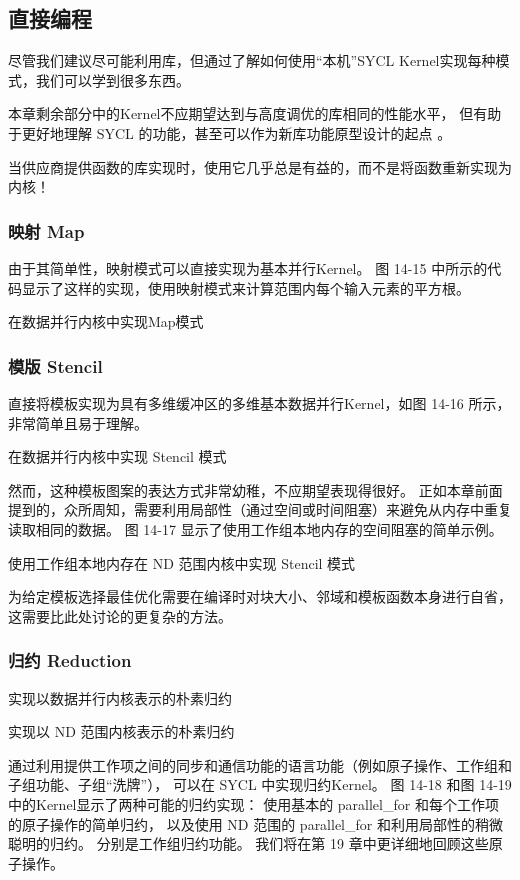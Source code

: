 \subsection{直接编程}
尽管我们建议尽可能利用库，但通过了解如何使用“本机”SYCL Kernel实现每种模式，我们可以学到很多东西。

本章剩余部分中的Kernel不应期望达到与高度调优的库相同的性能水平，
但有助于更好地理解 SYCL 的功能，甚至可以作为新库功能原型设计的起点 。

\begin{remark}[使用供应商提供的库！]
当供应商提供函数的库实现时，使用它几乎总是有益的，而不是将函数重新实现为内核！
\end{remark}

\subsubsection{映射 Map}
由于其简单性，映射模式可以直接实现为基本并行Kernel。 
图 14-15 中所示的代码显示了这样的实现，使用映射模式来计算范围内每个输入元素的平方根。

{\color{red} 在数据并行内核中实现Map模式}

\subsubsection{模版 Stencil}
直接将模板实现为具有多维缓冲区的多维基本数据并行Kernel，如图 14-16 所示，非常简单且易于理解。

{\color{red} 在数据并行内核中实现 Stencil 模式}

然而，这种模板图案的表达方式非常幼稚，不应期望表现得很好。 
正如本章前面提到的，众所周知，需要利用局部性（通过空间或时间阻塞）来避免从内存中重复读取相同的数据。 
图 14-17 显示了使用工作组本地内存的空间阻塞的简单示例。

{\color{red} 使用工作组本地内存在 ND 范围内核中实现 Stencil 模式}

为给定模板选择最佳优化需要在编译时对块大小、邻域和模板函数本身进行自省，这需要比此处讨论的更复杂的方法。

\subsubsection{归约 Reduction}
{\color{red} 实现以数据并行内核表示的朴素归约}

{\color{red} 实现以 ND 范围内核表示的朴素归约}

通过利用提供工作项之间的同步和通信功能的语言功能（例如原子操作、工作组和子组功能、子组“洗牌”），
可以在 SYCL 中实现归约Kernel。 
图 14-18 和图 14-19 中的Kernel显示了两种可能的归约实现：
使用基本的 parallel\_for 和每个工作项的原子操作的简单归约，
以及使用 ND 范围的 parallel\_for 和利用局部性的稍微聪明的归约。 
分别是工作组归约功能。 我们将在第 19 章中更详细地回顾这些原子操作。

